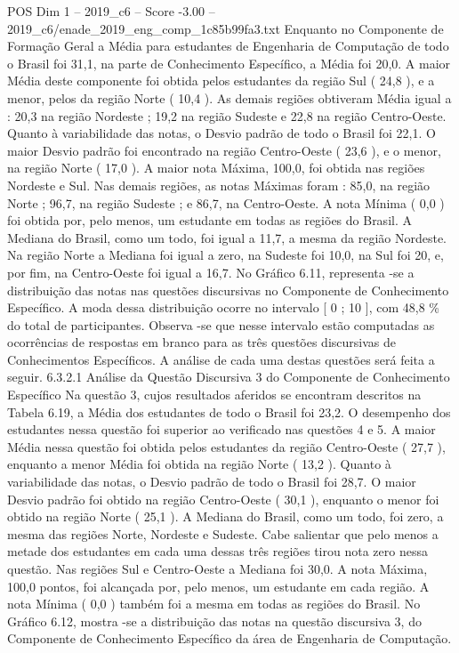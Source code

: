\begin{textsample}{POS Dim 1 – 2019\_c6 – Score -3.00 – 2019\_c6/enade\_2019\_eng\_comp\_1c85b99fa3.txt}
Enquanto no Componente de Formação Geral a Média para estudantes de Engenharia de Computação de todo o Brasil foi 31,1, na parte de Conhecimento Específico, a Média foi 20,0.
A maior Média deste componente foi obtida pelos estudantes da região Sul ( 24,8 ), e a menor, pelos da região Norte ( 10,4 ).
As demais regiões obtiveram Média igual a : 20,3 na região Nordeste ; 19,2 na região Sudeste e 22,8 na região Centro-Oeste.
Quanto à variabilidade das notas, o Desvio padrão de todo o Brasil foi 22,1.
O maior Desvio padrão foi encontrado na região Centro-Oeste ( 23,6 ), e o menor, na região Norte ( 17,0 ).
A maior nota Máxima, 100,0, foi obtida nas regiões Nordeste e Sul.
Nas demais regiões, as notas Máximas foram : 85,0, na região Norte ; 96,7, na região Sudeste ; e 86,7, na Centro-Oeste.
A nota Mínima ( 0,0 ) foi obtida por, pelo menos, um estudante em todas as regiões do Brasil.
A Mediana do Brasil, como um todo, foi igual a 11,7, a mesma da região Nordeste.
Na região Norte a Mediana foi igual a zero, na Sudeste foi 10,0, na Sul foi 20, e, por fim, na Centro-Oeste foi igual a 16,7.
No Gráfico 6.11, representa -se a distribuição das notas nas questões discursivas no Componente de Conhecimento Específico.
A moda dessa distribuição ocorre no intervalo [ 0 ; 10 ], com 48,8 \% do total de participantes.
Observa -se que nesse intervalo estão computadas as ocorrências de respostas em branco para as três questões discursivas de Conhecimentos Específicos.
A análise de cada uma destas questões será feita a seguir. 6.3.2.1 Análise da Questão Discursiva 3 do Componente de Conhecimento Específico Na questão 3, cujos resultados aferidos se encontram descritos na Tabela 6.19, a Média dos estudantes de todo o Brasil foi 23,2.
O desempenho dos estudantes nessa questão foi superior ao verificado nas questões 4 e 5.
A maior Média nessa questão foi obtida pelos estudantes da região Centro-Oeste ( 27,7 ), enquanto a menor Média foi obtida na região Norte ( 13,2 ).
Quanto à variabilidade das notas, o Desvio padrão de todo o Brasil foi 28,7.
O maior Desvio padrão foi obtido na região Centro-Oeste ( 30,1 ), enquanto o menor foi obtido na região Norte ( 25,1 ).
A Mediana do Brasil, como um todo, foi zero, a mesma das regiões Norte, Nordeste e Sudeste.
Cabe salientar que pelo menos a metade dos estudantes em cada uma dessas três regiões tirou nota zero nessa questão.
Nas regiões Sul e Centro-Oeste a Mediana foi 30,0.
A nota Máxima, 100,0 pontos, foi alcançada por, pelo menos, um estudante em cada região.
A nota Mínima ( 0,0 ) também foi a mesma em todas as regiões do Brasil.
No Gráfico 6.12, mostra -se a distribuição das notas na questão discursiva 3, do Componente de Conhecimento Específico da área de Engenharia de Computação.

\end{textsample}
